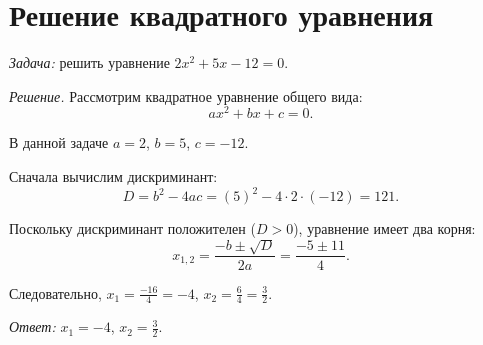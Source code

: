 \documentclass[12pt,a4paper]{article}
\begin{document}
\section{Решение квадратного уравнения}

\noindent\textit{Задача:} решить уравнение $2x^2+5x-12=0$.

\textit{Решение.} Рассмотрим квадратное уравнение общего вида:
\[
    ax^2+bx+c=0.
\]

В данной задаче $a=2$, $b=5$, $c=-12$.

Сначала вычислим дискриминант:
\[
    D=b^2-4ac=(5)^2-4\cdot 2\cdot(-12)=121.
\]

Поскольку дискриминант положителен ($D>0$), уравнение имеет два корня:
\[
    x_{1,2}=\frac{-b\pm\sqrt{D}}{2a}=\frac{-5\pm11}{4}.
\]

Следовательно, $x_1=\frac{-16}{4}=-4$, $x_2=\frac{6}{4}=\frac{3}{2}$.

\textit{Ответ:} $x_1=-4$, $x_2=\frac{3}{2}$.
\end{document}
